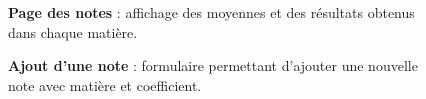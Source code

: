 \documentclass[12pt]{report}
\begin{document}
\begin{figure}[H]
\begin{minipage}[t]{0.45\textwidth}
			\caption*{\textbf{Page des notes} : affichage des moyennes et des résultats obtenus dans chaque matière.}
		\end{minipage}
		\hfill
		\begin{minipage}[t]{0.45\textwidth}
			\centering
			\caption*{\textbf{Ajout d’une note} : formulaire permettant d’ajouter une nouvelle note avec matière et coefficient.}
		\end{minipage}
	\end{figure}
	
\end{document}
